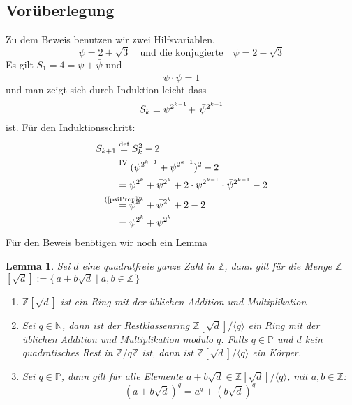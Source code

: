 \documentclass{article}
\newtheorem{lemma}{Lemma}
\newcommand{\Prime}{\ensuremath{\mathbb{P}}}
\newcommand{\Nature}{\ensuremath{\mathbb{N}}}
\newcommand{\Integer}{\ensuremath{\mathbb{Z}}}
\newcommand{\ZAdjdModq}{\ensuremath{\Integer[\sqrt{d}]/\langle q \rangle}}
\newcommand{\Zmodq}{\ensuremath{\Integer/q\Integer}}
\begin{document}
\subsection{Vor\"{u}berlegung}
Zu dem Beweis benutzen wir zwei Hilfsvariablen,
\[
	\psi = 2 + \sqrt{3}\quad \mbox{und die konjugierte}\quad \bar{\psi} = 2- \sqrt{3}
\]
Es gilt $S_1 = 4 = \psi + \bar{\psi}$ und 
\begin{equation}\label{psiProp}
	\psi \cdot \bar{\psi} = 1
\end{equation}
und man zeigt sich durch Induktion leicht dass 
\begin{equation}\label{Skpsi}
S_k \nobreak = \nobreak \psi^{2^{k-1}} \!+ \, \bar{\psi}^{2^{k-1}}
\end{equation} ist. F\"{u}r den Induktionsschritt:
\begin{align*}
	S_{k+1} &\overset{\text{def}}{=} S_{k}^2 - 2\\
			&\overset{\text{IV}}{=} (\psi^{2^{k-1}} + \bar{\psi}^{2^{k-1}})^2 - 2\\
			&= \psi^{2^{k}} + \bar{\psi}^{2^{k}} + 2\cdot \psi^{2^{k-1}} \cdot \bar{\psi}^{2^{k-1}} - 2\\
			&\overset{\mathclap{\text{(\ref{psiProp})}}}{=} \psi^{2^{k}} + \bar{\psi}^{2^{k}} + 2 - 2\\
			&= \psi^{2^{k}} + \bar{\psi}^{2^{k}}
\end{align*}
F\"{u}r den Beweis ben\"{o}tigen wir noch ein Lemma
\begin{lemma}\label{restRing}
	Sei $d$ eine quadratfreie ganze Zahl in \Integer, dann gilt 
	f\"{u}r die Menge \Integer$[\sqrt{d}]:=\{\, a + b\sqrt{d} \mid a,b\in \Integer \,\}$
	\begin{enumerate}
		\item \Integer$[\sqrt{d}]$ ist ein Ring mit der \"{u}blichen Addition und Multiplikation
		\item Sei $q \in \Nature$, dann ist der Restklassenring $\ZAdjdModq$ ein Ring mit der \"{u}blichen Addition und Multiplikation modulo $q$. Falls $q \in \Prime$  und $d$ kein quadratisches Rest in $\Zmodq$ ist, dann ist $\ZAdjdModq$ ein K\"{o}rper.
		\item Sei $q \in \Prime$, dann gilt f\"{u}r alle Elemente $a + b\sqrt{d} \in \ZAdjdModq$, mit $a,b\in \Integer$:
		\[
			(a + b\sqrt{d})^q  = a^q + (b\sqrt{d})^q
		\]
	\end{enumerate}
\end{lemma}
\end{document}
